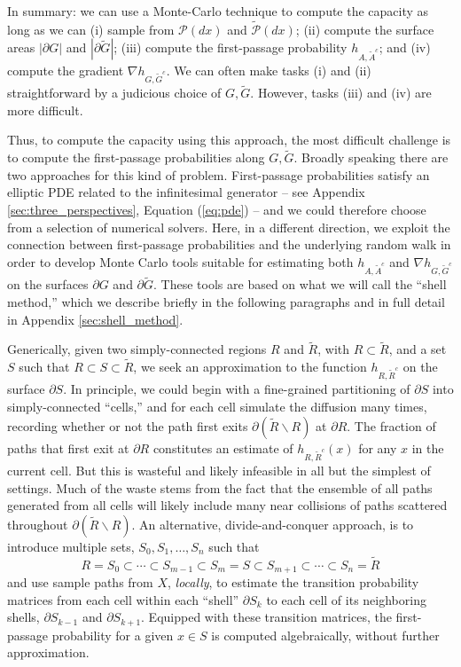 \documentclass[12pt, nofootinbib,english, amsmath, amssymb, aps, priprint, graphicx,floatfix]{revtex4-1}
\theoremstyle{plain}
\theoremstyle{definition}
\theoremstyle{plain}
\newcommand{\PMeasure}{\mathscr{P}(dx)}
\newcommand{\tPMeasure}{\tilde{\mathscr P}(dx)}
\begin{document}
In summary: we can use a Monte-Carlo technique to compute the capacity as long as we can (i) sample from $\PMeasure$ and $\tPMeasure$; (ii) compute the surface areas $|\partial G|$ and
$|\partial\tilde{G}|$; (iii)
compute the first-passage probability $h_{A, \tilde{A}^c}$; and (iv) compute the gradient
$\nabla h_{G, \tilde{G}^c}$.  
We can often make tasks (i) and (ii) straightforward by a judicious choice of $G,\tilde G$.  However, tasks (iii) and (iv) are more difficult.  

Thus, to compute the capacity using this approach, the most difficult challenge is to compute the first-passage probabilities along $G,\tilde G$.  Broadly speaking there are two approaches for this kind of problem.  First-passage probabilities satisfy an elliptic PDE related to the infinitesimal generator -- see Appendix \ref{sec:three_perspectives}, Equation (\ref{eq:pde}) -- and we could therefore choose from a selection of numerical solvers. Here, in a different direction, we exploit the connection between first-passage probabilities and the underlying random walk in order to develop Monte Carlo tools suitable for estimating both $h_{A, \tilde{A}^c}$ and $\nabla h_{G, \tilde{G}^c}$ on the surfaces
$\partial G$ and $\partial\tilde{G}$. These tools are based on
what we will call the ``shell method,'' which we describe briefly in the following paragraphs and in full detail in Appendix \ref{sec:shell_method}.

Generically, given two simply-connected regions $R$ and $\tilde{R}$, with $R\subset \tilde{R}$, and a set $S$ such that
$R\subset S  \subset\tilde{R}$, we seek an approximation to
the function $h_{R,\tilde{R}^c}$ on the surface $\partial S$. In principle, we could begin with a fine-grained partitioning of $\partial S$ into simply-connected ``cells,'' and for each cell simulate the diffusion many times, recording whether or not the path first exits $\partial (\tilde{R}\backslash R)$ at $\partial R$. The fraction of paths that first exit at $\partial R$ constitutes an estimate of
$h_{R,\tilde{R}^c}(x)$ for any $x$ in the current cell. But this is wasteful and likely infeasible in all but the simplest of settings. Much of the waste stems from the fact that the ensemble of all paths generated from all cells will likely include many near collisions of paths scattered throughout $\partial (\tilde{R}\backslash R)$. An alternative, divide-and-conquer  approach, is to introduce multiple sets, $S_0,S_1,\ldots,S_n$ such that
\begin{equation*}
R=S_0 \subset \cdots \subset S_{m-1}\subset S_m = S \subset S_{m+1} \subset \cdots \subset S_n = \tilde{R}
\end{equation*}
and use sample paths from $X$, {\em locally}, to estimate the transition probability matrices from each cell within each ``shell'' $\partial S_k$ to each cell of its neighboring shells, $\partial S_{k-1}$ and $\partial S_{k+1}$. Equipped with these transition matrices, the first-passage probability for a given $x\in S$ is computed algebraically, without further approximation.
\end{document}
